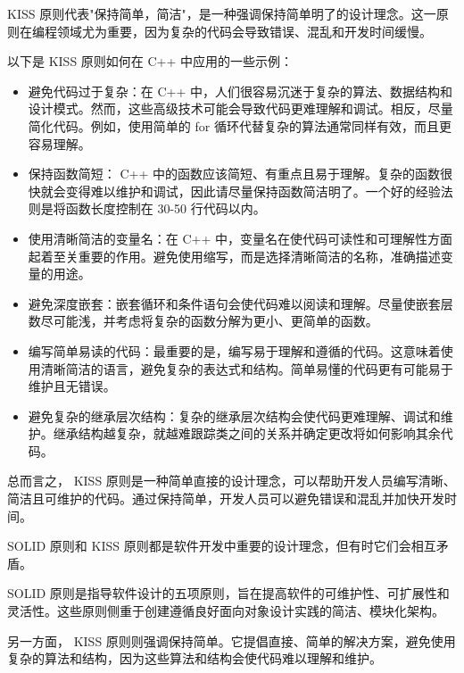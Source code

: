 KISS 原则代表"保持简单，简洁"，是一种强调保持简单明了的设计理念。这一原则在编程领域尤为重要，因为复杂的代码会导致错误、混乱和开发时间缓慢。

以下是 KISS 原则如何在 C++ 中应用的一些示例：

\begin{itemize}
\item
避免代码过于复杂：在 C++ 中，人们很容易沉迷于复杂的算法、数据结构和设计模式。然而，这些高级技术可能会导致代码更难理解和调试。相反，尽量简化代码。例如，使用简单的 for 循环代替复杂的算法通常同样有效，而且更容易理解。

\item
保持函数简短： C++ 中的函数应该简短、有重点且易于理解。复杂的函数很快就会变得难以维护和调试，因此请尽量保持函数简洁明了。一个好的经验法则是将函数长度控制在 30-50 行代码以内。

\item
使用清晰简洁的变量名：在 C++ 中，变量名在使代码可读性和可理解性方面起着至关重要的作用。避免使用缩写，而是选择清晰简洁的名称，准确描述变量的用途。

\item
避免深度嵌套：嵌套循环和条件语句会使代码难以阅读和理解。尽量使嵌套层数尽可能浅，并考虑将复杂的函数分解为更小、更简单的函数。

\item
编写简单易读的代码：最重要的是，编写易于理解和遵循的代码。这意味着使用清晰简洁的语言，避免复杂的表达式和结构。简单易懂的代码更有可能易于维护且无错误。

\item
避免复杂的继承层次结构：复杂的继承层次结构会使代码更难理解、调试和维护。继承结构越复杂，就越难跟踪类之间的关系并确定更改将如何影响其余代码。
\end{itemize}

总而言之， KISS 原则是一种简单直接的设计理念，可以帮助开发人员编写清晰、简洁且可维护的代码。通过保持简单，开发人员可以避免错误和混乱并加快开发时间。


SOLID 原则和 KISS 原则都是软件开发中重要的设计理念，但有时它们会相互矛盾。

SOLID 原则是指导软件设计的五项原则，旨在提高软件的可维护性、可扩展性和灵活性。这些原则侧重于创建遵循良好面向对象设计实践的简洁、模块化架构。

另一方面， KISS 原则则强调保持简单。它提倡直接、简单的解决方案，避免使用复杂的算法和结构，因为这些算法和结构会使代码难以理解和维护。

